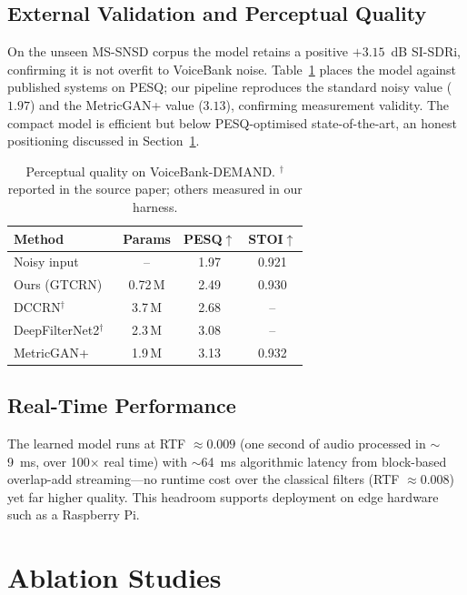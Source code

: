 \documentclass[runningheads]{llncs}
\begin{document}
\subsection{External Validation and Perceptual Quality}
On the unseen MS-SNSD corpus the model retains a positive $+3.15$~dB SI-SDRi,
confirming it is not overfit to VoiceBank noise. Table~\ref{tab:pesq} places the
model against published systems on PESQ; our pipeline reproduces the standard
noisy value ($1.97$) and the MetricGAN+ value ($3.13$), confirming measurement
validity. The compact model is efficient but below PESQ-optimised
state-of-the-art, an honest positioning discussed in
Section~\ref{sec:ablation}.

\begin{table}[t]
\centering
\caption{Perceptual quality on VoiceBank-DEMAND. $^{\dagger}$reported in the
source paper; others measured in our harness.}
\label{tab:pesq}
\setlength{\tabcolsep}{7pt}
\begin{tabular}{lccc}
\toprule
Method & Params & PESQ$\uparrow$ & STOI$\uparrow$ \\
\midrule
Noisy input               & --      & 1.97 & 0.921 \\
Ours (GTCRN)              & 0.72\,M & 2.49 & 0.930 \\
DCCRN$^{\dagger}$~\cite{dccrn}          & 3.7\,M  & 2.68 & -- \\
DeepFilterNet2$^{\dagger}$~\cite{deepfilternet} & 2.3\,M  & 3.08 & -- \\
MetricGAN+~\cite{metricgan}            & 1.9\,M  & 3.13 & 0.932 \\
\bottomrule
\end{tabular}
\end{table}

\subsection{Real-Time Performance}
The learned model runs at RTF $\approx 0.009$ (one second of audio processed in
$\sim$9~ms, over 100$\times$ real time) with $\sim$64~ms algorithmic latency
from block-based overlap-add streaming---no runtime cost over the classical
filters (RTF $\approx 0.008$) yet far higher quality. This headroom supports
deployment on edge hardware such as a Raspberry Pi.

\section{Ablation Studies}\label{sec:ablation}
\end{document}
